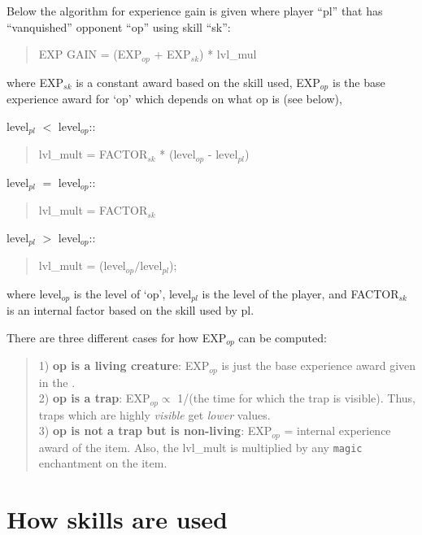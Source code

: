 Below the algorithm for experience gain is given where player ``pl'' 
that has ``vanquished'' opponent ``op'' using skill ``sk'':
\begin{quote}
EXP GAIN = (EXP$_{op}$ + EXP$_{sk}$) * lvl\_mul
\end{quote}
where EXP$_{sk}$ is a constant award based on the skill used, 
EXP$_{op}$ is the base experience award for `op' which depends
on what op is (see below), 

 level$_{pl}$ $<$ level$_{op}$:: 
\begin{quote}
lvl\_mult = FACTOR$_{sk}$ * (level$_{op}$ - level$_{pl}$)
\end{quote}
 level$_{pl}$ $=$ level$_{op}$:: 
\begin{quote}
lvl\_mult = FACTOR$_{sk}$
\end{quote}
 level$_{pl}$ $>$ level$_{op}$:: 
\begin{quote}
lvl\_mult = (level$_{op}/$level$_{pl}$); 
\end{quote}
where level$_{op}$ is the level of `op', level$_{pl}$ is the level
of the player, and FACTOR$_{sk}$ is an internal factor based on
the skill used by pl.

There are three different cases for how EXP$_{op}$ can be computed:
\begin{quote}
1) {\bf op is a living creature}: EXP$_{op}$ is just the base 
experience award given in the \spoiler . \\

2) {\bf op is a trap}: EXP$_{op} \propto$ 1/(the time for which the
trap is visible). Thus, traps which are highly {\em visible} get {\em lower}
values. \\

3) {\bf op is not a trap but is non-living}: EXP$_{op}$ = internal
experience award of the item. Also, the lvl\_mult is multiplied by
any {\tt magic} enchantment on the item.
\end{quote}

\section{How skills are used}
 
